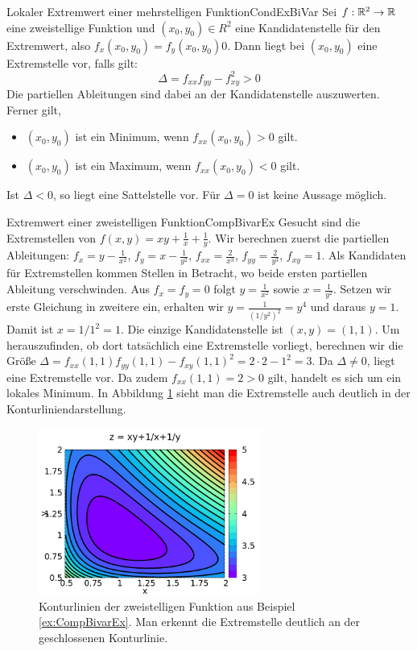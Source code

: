\begin{statement}{Lokaler Extremwert einer mehrstelligen Funktion}{CondExBiVar}
    Sei $f: \mathbb{R}^2 \to \mathbb{R}$ eine zweistellige Funktion und $(x_0,y_0)\in R^2$ eine Kandidatenstelle für den Extremwert, also $f_x(x_0,y_0) = f_y(x_0,y_0) 0$. Dann liegt bei $(x_0,y_0)$ eine Extremstelle vor, falls gilt:
    $$
        \Delta = f_{xx} f_{yy} - f_{xy}^2 > 0
    $$
    Die partiellen Ableitungen sind dabei an der Kandidatenstelle auszuwerten. Ferner gilt,
    \begin{itemize}
        \item $(x_0,y_0)$ ist ein Minimum, wenn $f_{xx}(x_0,y_0) > 0$ gilt.
        \item $(x_0,y_0)$ ist ein Maximum, wenn $f_{xx}(x_0,y_0) < 0$ gilt.
    \end{itemize}
    Ist $\Delta < 0$, so liegt eine Sattelstelle vor. Für $\Delta = 0$ ist keine Aussage möglich.
\end{statement}

\begin{example}{Extremwert einer zweistelligen Funktion}{CompBivarEx}
    Gesucht sind die Extremstellen von $f(x,y) = xy + \frac{1}{x} + \frac{1}{y}$. Wir berechnen zuerst die partiellen Ableitungen: $f_x = y-\frac{1}{x^2}$, $f_y = x-\frac{1}{y^2}$, $f_{xx} = \frac{2}{x^3}$, $f_{yy} = \frac{2}{y^3}$, $f_{xy} = 1$. Als Kandidaten für Extremstellen kommen Stellen in Betracht, wo beide ersten partiellen Ableitung verschwinden. Aus $f_x = f_y = 0$ folgt $y=\frac{1}{x^2}$ sowie $x=\frac{1}{y^2}$. Setzen wir erste Gleichung in zweitere ein, erhalten wir $y=\frac{1}{\left(1/y^2\right)^2} = y^4$ und daraus $y=1$. Damit ist $x=1/1^2 = 1$. Die einzige Kandidatenstelle ist $(x,y) =(1,1)$. Um herauszufinden, ob dort tatsächlich eine Extremstelle vorliegt, berechnen wir die Größe $\Delta = f_{xx}(1,1)f_{yy}(1,1) - f_{xy}(1,1)^2 = 2\cdot2 - 1^2 = 3$. Da $\Delta \ne 0$, liegt eine Extremstelle vor. Da zudem $f_{xx}(1,1) = 2 > 0$ gilt, handelt es sich um ein lokales Minimum. In Abbildung \ref{fig:ExCompBivarEx} sieht man die Extremstelle auch deutlich in der Konturliniendarstellung.
\end{example}

\begin{figure}
    \centering
    \includegraphics[width=0.65\textwidth]{./gnuplot/contour-field-extrem-values}
    \caption[Extremwertbestimmung mittels Konturlinien]{Konturlinien der zweistelligen Funktion aus Beispiel \ref{ex:CompBivarEx}. Man erkennt die Extremstelle deutlich an der geschlossenen Konturlinie.}
    \label{fig:ExCompBivarEx}
\end{figure}
